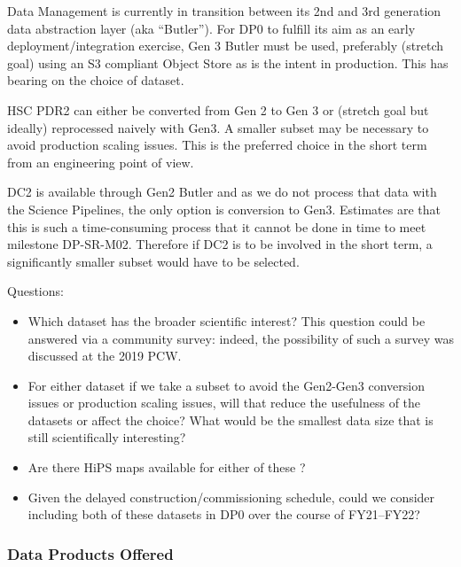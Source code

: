 Data Management is currently in transition between its 2nd and 3rd generation data abstraction layer (aka ``Butler''). For DP0 to fulfill its aim as an early deployment/integration exercise, Gen 3 Butler must be used, preferably (stretch goal) using an S3 compliant Object Store as is the intent in production. This has bearing on the choice of dataset.

HSC PDR2 can either be converted from Gen 2 to Gen 3 or (stretch goal but ideally) reprocessed naively with Gen3. A smaller subset may be necessary to avoid production scaling issues. This is the preferred choice in the short term from an engineering point of view.

DC2 is available through Gen2 Butler and as we do not process that data with the Science Pipelines, the only option is conversion to Gen3. Estimates are that this is such a time-consuming process that it cannot be done in time to meet milestone DP-SR-M02. Therefore if DC2 is to be involved in the short term, a significantly smaller subset would have to be selected.

Questions:

\begin{itemize}

\item Which dataset has the broader scientific interest? This question could be answered via a community survey: indeed, the possibility of such a survey was discussed at the 2019 PCW.

\item For either dataset if we take a subset to avoid the Gen2-Gen3 conversion issues or production scaling issues, will that reduce the usefulness of the datasets or affect the choice? What would be the smallest data size that is still scientifically interesting?

\item Are there HiPS maps available for either of these ?


\item Given the delayed construction/commissioning schedule, could we consider including both of these datasets in DP0 over the course of FY21--FY22?

\end{itemize}

\subsubsection{Data Products Offered}

